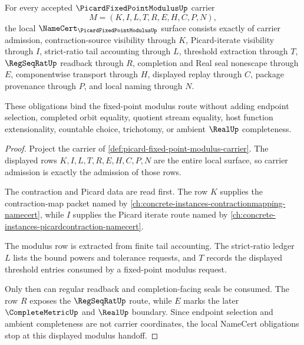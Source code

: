\begin{theorem}
\label{thm:picard-fixed-point-modulus-namecert-obligations}
For every accepted $\PicardFixedPointModulusUp$ carrier
$$
M=(K,I,L,T,R,E,H,C,P,N),
$$
the local $\NameCert_{\PicardFixedPointModulusUp}$ surface consists exactly of carrier admission, contraction-source visibility through $K$, Picard-iterate visibility through $I$, strict-ratio tail accounting through $L$, threshold extraction through $T$, $\RegSeqRatUp$ readback through $R$, completion and Real seal nonescape through $E$, componentwise transport through $H$, displayed replay through $C$, package provenance through $P$, and local naming through $N$.

These obligations bind the fixed-point modulus route without adding endpoint selection, completed orbit equality, quotient stream equality, host function extensionality, countable choice, trichotomy, or ambient $\RealUp$ completeness.
\end{theorem}
\begin{proof}
Project the carrier of \autoref{def:picard-fixed-point-modulus-carrier}. The displayed rows $K,I,L,T,R,E,H,C,P,N$ are the entire local surface, so carrier admission is exactly the admission of those rows.

The contraction and Picard data are read first. The row $K$ supplies the contraction-map packet named by \autoref{ch:concrete-instances-contractionmapping-namecert}, while $I$ supplies the Picard iterate route named by \autoref{ch:concrete-instances-picardcontraction-namecert}.

The modulus row is extracted from finite tail accounting. The strict-ratio ledger $L$ lists the bound powers and tolerance requests, and $T$ records the displayed threshold entries consumed by a fixed-point modulus request.

Only then can regular readback and completion-facing seals be consumed. The row $R$ exposes the $\RegSeqRatUp$ route, while $E$ marks the later $\CompleteMetricUp$ and $\RealUp$ boundary. Since endpoint selection and ambient completeness are not carrier coordinates, the local NameCert obligations stop at this displayed modulus handoff.
\end{proof}

